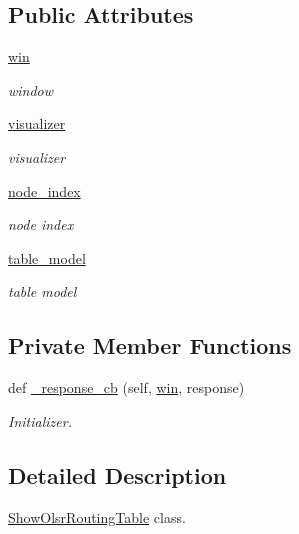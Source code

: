 \subsection*{Public Attributes}
\begin{DoxyCompactItemize}
\item 
\hyperlink{classolsr_1_1ShowOlsrRoutingTable_a2939f3f7a402c0356634fd0075b990a8}{win}
\begin{DoxyCompactList}\small\item\em window \end{DoxyCompactList}\item 
\hyperlink{classolsr_1_1ShowOlsrRoutingTable_a1ffe99444da97be6a1afe82990d6dd4e}{visualizer}
\begin{DoxyCompactList}\small\item\em visualizer \end{DoxyCompactList}\item 
\hyperlink{classolsr_1_1ShowOlsrRoutingTable_a10f34aed8044599bc9c200ebbbe15dc1}{node\+\_\+index}
\begin{DoxyCompactList}\small\item\em node index \end{DoxyCompactList}\item 
\hyperlink{classolsr_1_1ShowOlsrRoutingTable_a25e5faeb19a0c3ea176550672831e104}{table\+\_\+model}
\begin{DoxyCompactList}\small\item\em table model \end{DoxyCompactList}\end{DoxyCompactItemize}
\subsection*{Private Member Functions}
\begin{DoxyCompactItemize}
\item 
def \hyperlink{classolsr_1_1ShowOlsrRoutingTable_adb15417bbbe2d97c5d631be3fc673698}{\+\_\+response\+\_\+cb} (self, \hyperlink{classolsr_1_1ShowOlsrRoutingTable_a2939f3f7a402c0356634fd0075b990a8}{win}, response)
\begin{DoxyCompactList}\small\item\em Initializer. \end{DoxyCompactList}\end{DoxyCompactItemize}


\subsection{Detailed Description}
\hyperlink{classolsr_1_1ShowOlsrRoutingTable}{Show\+Olsr\+Routing\+Table} class. 

